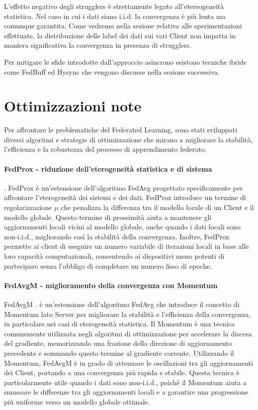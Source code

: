 \documentclass[a4paper, oneside, openright]{report}
\let\oldsection\section
\renewcommand{\section}{\newpage\oldsection}
\begin{document}
L'effetto negativo degli strugglers è strettamente legato all'etereogeneità statistica. Nel caso in cui i dati siano i.i.d. la convergenza è più lenta ma comunque garantita. Come vedremo nella sezione relativa alle sperimentazioni effettuate, la distribuzione delle label dei dati sui vari Client non impatta in maniera significativa la convergenza in presenza di strugglers.

Per mitigare le sfide introdotte dall'approccio asincrono esistono tecniche ibride come FedBuff ed Hysync che vengono discusse nella sezione successiva.

\section{Ottimizzazioni note}
Per affrontare le problematiche del Federated Learning, sono stati sviluppati diversi algoritmi e strategie di ottimizzazione che mirano a migliorare la stabilità, l'efficienza e la robustezza del processo di apprendimento federato. 

\paragraph{FedProx - riduzione dell'eterogeneità statistica e di sistema}.
FedProx \cite{DBLP:journals/corr/abs-1812-06127} è un'estensione dell'algoritmo FedAvg progettato specificamente per affrontare l'eterogeneità dei sistemi e dei dati. FedProx introduce un termine di regolarizzazione $\mu$ che penalizza la differenza tra il modello locale di un Client e il modello globale. Questo termine di prossimità aiuta a mantenere gli aggiornamenti locali vicini al modello globale, anche quando i dati locali sono non-i.i.d., migliorando così la stabilità della convergenza. Inoltre, FedProx permette ai client di eseguire un numero variabile di iterazioni locali in base alle loro capacità computazionali, consentendo ai dispositivi meno potenti di partecipare senza l'obbligo di completare un numero fisso di epoche.

\paragraph{FedAvgM - miglioramento della convergenza con Momentum}
FedAvgM \cite{DBLP:journals/corr/abs-1909-06335}. è un'estensione dell'algoritmo FedAvg che introduce il concetto di Momentum lato Server per migliorare la stabilità e l'efficienza della convergenza, in particolare nei casi di eterogeneità statistica. Il Momentum è una tecnica comunemente utilizzata negli algoritmi di ottimizzazione per accelerare la discesa del gradiente, memorizzando una frazione della direzione di aggiornamento precedente e sommando questo termine al gradiente corrente. Utilizzando il Momentum, FedAvgM è in grado di attenuare le oscillazioni tra gli aggiornamenti dei Client, portando a una convergenza più rapida e stabile. Questa tecnica è particolarmente utile quando i dati sono non-i.i.d., poiché il Momentum aiuta a smussare le differenze tra gli aggiornamenti locali e a garantire una progressione più uniforme verso un modello globale ottimale.
\end{document}
